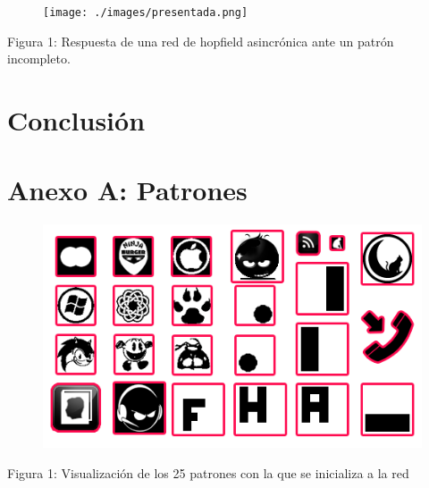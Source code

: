 \documentclass[%
    final,
    reprint,
    notitlepage,
    narroweqnarray,
    inline,
    twoside,
    invited
    ]{ieee}
\begin{document}
\begin{figure}[H]
\begin{center}
\texttt{[image: ./images/presentada.png]}
\label{modelado}
\end{center}
\end{figure}

\begin{center}
\par Figura 1: Respuesta de una red de hopfield asincrónica ante un patrón incompleto.
\end{center}


\section{Conclusión}






\clearpage
\onecolumn

\section*{Anexo A: Patrones}

\begin{figure}[H]
\begin{center}
\includegraphics[scale=0.70]{./images/patterns.png}
\label{modelado}
\end{center}
\end{figure}

\begin{center}
\par Figura 1: Visualización de los 25 patrones con la que se inicializa a la red
\end{center}



\end{document}
